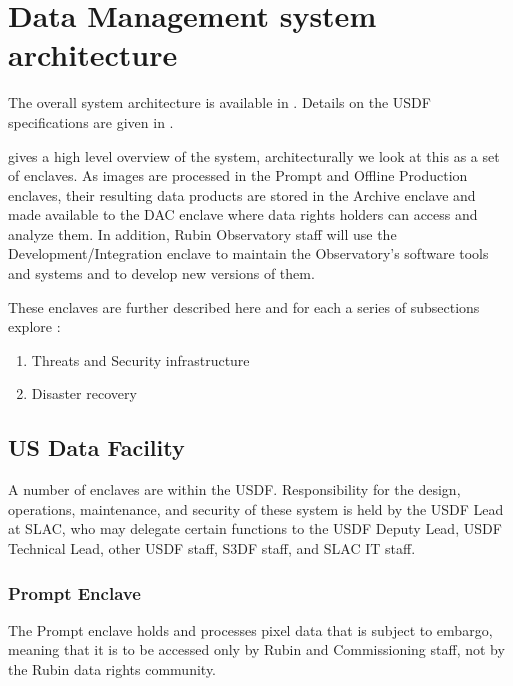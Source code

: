 

\section{Data Management system architecture} \label{sec:dparc}
The overall system architecture is available in .
Details on the \gls{USDF} specifications are given in .

 gives a high level overview of the system, architecturally we look
at this as a set of enclaves.
As images are processed in the Prompt and Offline Production enclaves, their resulting data products are stored in the \gls{Archive} enclave and made available to the DAC enclave where data rights holders can access and analyze them.
In addition, Rubin Observatory staff will use the Development/Integration enclave to maintain the Observatory's software tools and systems and to develop new versions of them.

These enclaves are further described here and for each a series of subsections explore :


\begin{enumerate}
\item Threats and Security infrastructure
\item Disaster recovery
\end{enumerate}

\subsection{US Data Facility}\label{sec:usdf}

A number of enclaves are within the USDF.
Responsibility for the design, operations, maintenance, and security of these system is held by the USDF Lead at SLAC, who may delegate certain functions to the USDF Deputy Lead, USDF Technical Lead, other USDF staff, S3DF staff, and SLAC IT staff.

\subsubsection{Prompt \gls{Enclave}} \label{sec:promptenc}

The Prompt enclave holds and processes pixel data that is subject to embargo, meaning that it is to be accessed only by Rubin and Commissioning staff, not by the Rubin data rights community.

